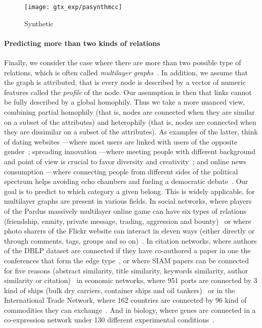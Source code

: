 \begin{figure}[phtb]
  \centering
  \texttt{[image: gtx\_exp/pasynthmcc]}
  \caption{Synthetic \lpa{} }\label{fig:gtx_xp_pasynthmcc}
\end{figure}

\vspace{-\baselineskip}
\paragraph{Predicting more than two kinds of relations}

Finally, we consider the case where there are more than two possible type of relations, which is
often called \emph{multilayer graphs}~\autocites{Kivela2014}{multiSurvey14}. In addition, we assume
that the graph is attributed, that is every node is described by a vector of numeric features called
the \emph{profile} of the node. Our assumption is then that links cannot be fully described by a
global homophily. Thus we take a more nuanced view, combining partial homophily (that is, nodes are
connected when they are similar on a subset of the attributes) and heterophily (that is, nodes are
connected when they are dissimilar on a subset of the attributes). As examples of the latter, think
of dating websites ---where most users are linked with users of the opposite
gender~\autocites{homophilyMyspace09}{Tinder16}; spreading innovation ---where meeting people with
different background and point of view is crucial to favor diversity and
creativity~\autocite{rogers2003diffusion}; and online news consumption ---where connecting people
from different sides of the political spectrum helps avoiding echo chambers and fueling a democratic
debate~\autocite{balancedNews17}. Our goal is to predict to which category a given belong. This is
widely applicable, for multilayer graphs are present  in various fields. In social networks, where
players of the Pardus massively multilayer online game can have six types of relations (friendship,
enmity, private message, trading, aggression and bounty)~\autocite{Szell2010} or where photo sharers
of the Flickr website can interact in eleven ways (either directly or through comments, tags, groups
and so on)~\autocite{RecoFlickrMulti11}. In citation networks, where authors of the DBLP dataset are
connected if they have co-authored a paper in one the  conferences that form the edge
type~\autocite{communityDBLPbyConf05}, or where  SIAM papers can be connected for five
reasons (abstract similarity, title similarity, keywords similarity, author similarity or
citation)~\autocite{articlesMultiSim11} in economic networks, where 951 ports are connected by 3
kind of ships (bulk dry carriers, container ships and oil tankers)~\autocite{ports3kindofships10} or
in the International Trade Network, where 162 countries are connected by 96 kind of commodities they
can exchange~\autocite{worldTradeNetwork10}. And in biology, where genes are connected in a
co-expression network under 130 different experimental conditions~\autocite{bioLayerExp11}.

